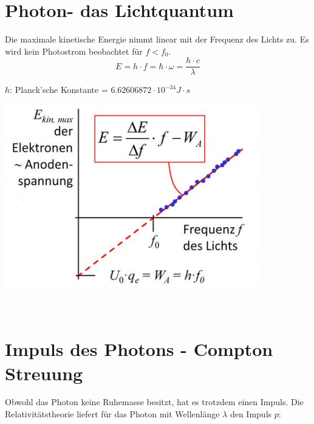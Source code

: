 \section{Photon- das Lichtquantum}
Die maximale kinetische Energie nimmt linear mit der Frequenz des Lichts zu. Es wird kein Photostrom beobachtet für $f<f_0$.\
\[
	E=h\cdot f = \hbar \cdot \omega = \frac{h \cdot c}{\lambda}
\]
\begin{footnotesize}
	$h$:	Planck'sche Konstante = $6.62606872\cdot 10^{-34} J\cdot s$\\
\end{footnotesize}
\begin{center}
	\includegraphics[scale = 0.3]{../fig/photon_energie.jpg}
\end{center}
\
\\
\section{Impuls des Photons - Compton Streuung}
Obwohl das Photon keine Ruhemasse besitzt, hat es trotzdem einen Impuls. Die Relativitätstheorie liefert für das Photon mit Wellenlänge $\lambda$ den Impuls $p$:\

